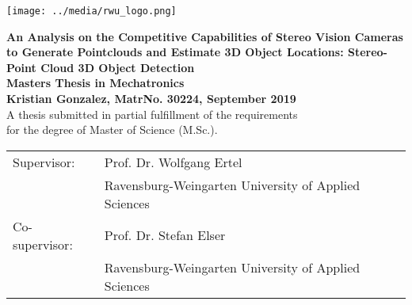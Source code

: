 \pagestyle{empty}
\begin{flushright}
\texttt{[image: ../media/rwu\_logo.png]}
\end{flushright}

\begin{center}
\vspace*{2cm}

\LARGE
\textbf{An Analysis on the Competitive Capabilities of Stereo Vision Cameras to Generate Pointclouds and Estimate 3D Object Locations: Stereo-Point Cloud 3D Object Detection}\\
\Large
\vspace*{2cm}
\noindent \textbf{Masters Thesis in Mechatronics}\\
\vspace*{0.5cm}
\noindent \textbf{Kristian Gonzalez, MatrNo. 30224, September 2019}\\
\vspace*{2cm}
\normalsize
A thesis submitted in partial fulfillment of the requirements\\ for the degree
of Master of Science (M.Sc.).

\end{center}

\vspace*{4.5cm}
\begin{tabular}{ll}
Supervisor: & Prof. Dr. Wolfgang Ertel \\
 & Ravensburg-Weingarten University of Applied Sciences\\
Co-supervisor: & Prof. Dr. Stefan Elser\\
 & Ravensburg-Weingarten University of Applied Sciences\\
\end{tabular}
